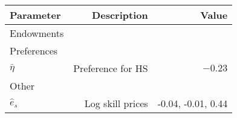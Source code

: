\begin{tabular}{lrr}
\hline
Parameter & Description  & Value  \\
\hline
Endowments &   &   \\
Preferences &   &   \\
$\bar{\eta}$ & Preference for HS  & $-0.23$  \\
Other &   &   \\
$\hat{e}_{s}$ & Log skill prices  & -0.04, -0.01, 0.44  \\
\hline
\end{tabular}%
